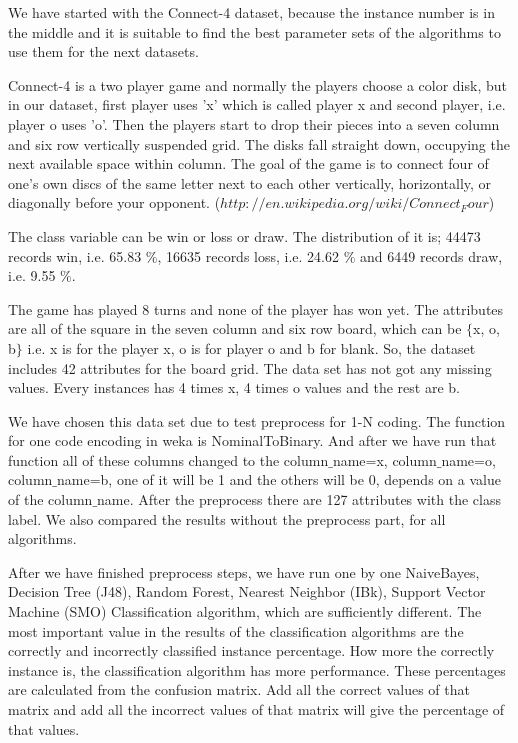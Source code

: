 \documentclass[a4paper]{article}
\begin{document}
We have started with the Connect-4 dataset, because the instance number is in
the middle and it is suitable to find the best parameter sets of the algorithms
to use them for the next datasets.

Connect-4 is a two player game and normally the players choose a color disk,
but in our dataset, first player uses 'x' which is called player x and second
player, i.e. player o uses 'o'. Then the players start to drop their pieces
into a seven column and six row vertically suspended grid. The disks fall
straight down, occupying the next available space within column. The goal of
the game is to connect four of one's own discs of the same letter next to each
other vertically, horizontally, or diagonally before your opponent.
($http://en.wikipedia.org/wiki/Connect_Four$) 

The class variable can be win or loss or draw. The distribution of it is; 44473
records win, i.e. 65.83 $\%$, 16635 records loss,  i.e. 24.62 $\%$ and 6449
records draw,  i.e. 9.55 $\%$.

The game has played 8 turns and none of the player has won yet. The attributes
are all of the square in the seven column and six row board, which can be
$\{$x, o, b$\}$ i.e. x is for the player x, o is for player o and b for blank.
So, the dataset includes 42 attributes for the board grid. The data set has not
got any missing values. Every instances has 4 times x, 4 times o values and the
rest are b. 

We have chosen this data set due to test preprocess for 1-N coding. The
function for one code encoding in weka is NominalToBinary. And after we have
run that function all of these columns changed to the column$\_$name=x,
column$\_$name=o, column$\_$name=b, one of it will be 1 and the others will be
0, depends on a value of the column$\_$name. After the preprocess there are 127
attributes with the class label. We also compared the results without the
preprocess part, for all algorithms.

After we have finished preprocess steps, we have run one by one NaiveBayes,
Decision Tree (J48), Random Forest, Nearest Neighbor (IBk), Support Vector
Machine (SMO) Classification algorithm, which are sufficiently different. The
most important value in the results of the classification algorithms are the
correctly and incorrectly classified instance percentage. How more the
correctly instance is, the classification algorithm has more performance. These
percentages are calculated from the confusion matrix. Add all the correct
values of that matrix and add all the incorrect values of that matrix will give
the percentage of that values. 
\end{document}
